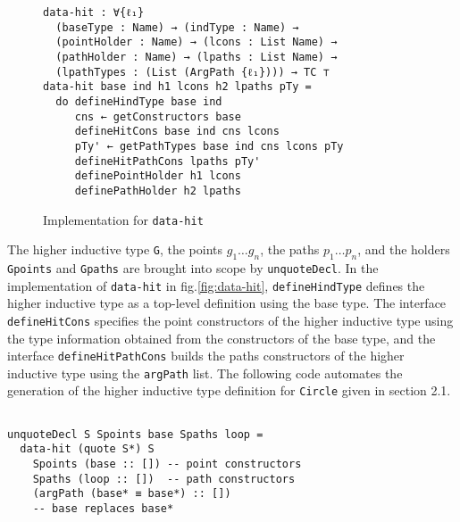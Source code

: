 \documentclass[sigplan,10pt]{acmart}
\begin{document}
\begin{figure}
\begin{center}
\begingroup
\fontsize{7pt}{9pt}\selectfont
\begin{Verbatim}
data-hit : ∀{ℓ₁} 
  (baseType : Name) → (indType : Name) →
  (pointHolder : Name) → (lcons : List Name) →
  (pathHolder : Name) → (lpaths : List Name) →
  (lpathTypes : (List (ArgPath {ℓ₁}))) → TC ⊤
data-hit base ind h1 lcons h2 lpaths pTy =
  do defineHindType base ind
     cns ← getConstructors base
     defineHitCons base ind cns lcons
     pTy' ← getPathTypes base ind cns lcons pTy
     defineHitPathCons lpaths pTy'
     definePointHolder h1 lcons
     definePathHolder h2 lpaths
\end{Verbatim}
\endgroup
\end{center}
\caption{Implementation for {\tt data-hit}}
\label{fig:data-hit}
\end{figure}
\normalsize


The higher inductive type \texttt{G}, the points $g_1 \ldots g_n$, the paths $p_1 \ldots p_n$, and the holders \texttt{Gpoints} and \texttt{Gpaths} are brought into scope by {\tt unquoteDecl}. In the implementation of {\tt data-hit} in fig.\eqref{fig:data-hit}, {\tt defineHindType} defines the higher inductive type as a top-level definition using the base type. The interface {\tt defineHitCons} specifies the point constructors of the higher inductive type using the type information obtained from the constructors of the base type, and the interface {\tt defineHitPathCons} builds the paths constructors of the higher inductive type using the {\tt argPath} list. The following code automates the generation of the higher inductive type definition for {\tt Circle} given in section 2.1.
\begin{center}
\begingroup
\begin{BVerbatim}

unquoteDecl S Spoints base Spaths loop =
  data-hit (quote S*) S
    Spoints (base :: []) -- point constructors
    Spaths (loop :: [])  -- path constructors
    (argPath (base* ≡ base*) :: []) 
    -- base replaces base*

\end{BVerbatim}
\endgroup
\end{center}
\end{document}
